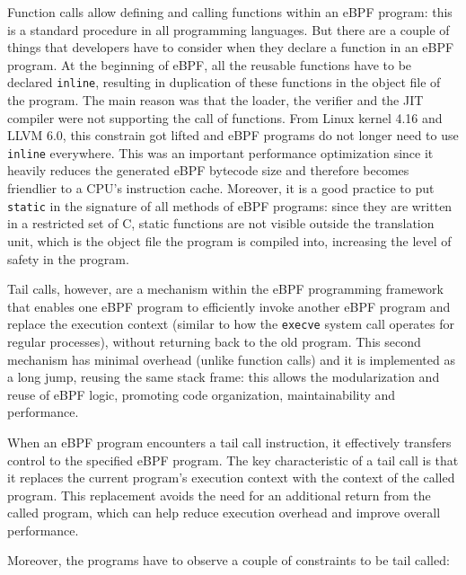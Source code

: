 Function calls allow defining and calling functions within an eBPF program: this is a standard procedure in all programming languages. 
But there are a couple of things that developers have to consider when they declare a function in an eBPF program.
At the beginning of eBPF, all the reusable functions have to be declared \colorbox{backcolour}{\lstinline[style=commandline, language=bash, breaklines=true]|inline|}, resulting in duplication of these functions in the object file of the program.
The main reason was that the loader, the verifier and the JIT compiler were not supporting the call of functions.
From Linux kernel 4.16 and LLVM 6.0, this constrain got lifted and eBPF programs do not longer need to use \colorbox{backcolour}{\lstinline[style=commandline, language=bash, breaklines=true]|inline|} everywhere.
This was an important performance optimization since it heavily reduces the generated eBPF bytecode size and therefore becomes friendlier to a CPU’s instruction cache.
Moreover, it is a good practice to put \colorbox{backcolour}{\lstinline[style=commandline, language=bash, breaklines=true]|static|} in the signature of all methods of eBPF programs: since they are written in a restricted set of C, static functions are not visible outside the translation unit, which is the object file the program is compiled into, increasing the level of safety in the program.

Tail calls, however, are a mechanism within the eBPF programming framework that enables one eBPF program to efficiently invoke another eBPF program and replace the execution context (similar to how the \colorbox{backcolour}{\lstinline[style=commandline, language=bash, breaklines=true]|execve|} system call operates for regular processes), without returning back to the old program.
This second mechanism has minimal overhead (unlike function calls) and it is implemented as a long jump, reusing the same stack frame: this allows the modularization and reuse of eBPF logic, promoting code organization, maintainability and performance.

When an eBPF program encounters a tail call instruction, it effectively transfers control to the specified eBPF program.
The key characteristic of a tail call is that it replaces the current program's execution context with the context of the called program. 
This replacement avoids the need for an additional return from the called program, which can help reduce execution overhead and improve overall performance.

Moreover, the programs have to observe a couple of constraints to be tail called:

